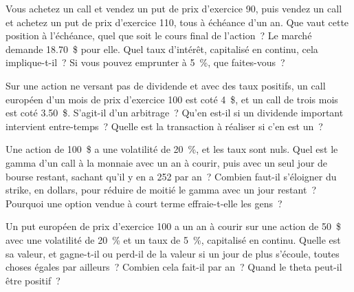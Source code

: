 \begin{question}\label{iq:iv2:options-parity-and-greeks:18}
Vous achetez un call et vendez un put de prix d'exercice 90, puis vendez un call et achetez un put de prix d'exercice 110, tous à échéance d'un an. Que vaut cette position à l'échéance, quel que soit le cours final de l'action~? Le marché demande 18.70~\$ pour elle. Quel taux d'intérêt, capitalisé en continu, cela implique-t-il~? Si vous pouvez emprunter à 5~\%, que faites-vous~?
\end{question}

\begin{question}\label{iq:iv2:options-parity-and-greeks:19}
Sur une action ne versant pas de dividende et avec des taux positifs, un call européen d'un mois de prix d'exercice 100 est coté 4~\$, et un call de trois mois est coté 3.50~\$. S'agit-il d'un arbitrage~? Qu'en est-il si un dividende important intervient entre-temps~? Quelle est la transaction à réaliser si c'en est un~?
\end{question}

\begin{question}\label{iq:iv2:options-parity-and-greeks:20}
Une action de 100~\$ a une volatilité de 20~\%, et les taux sont nuls. Quel est le gamma d'un call à la monnaie avec un an à courir, puis avec un seul jour de bourse restant, sachant qu'il y en a 252 par an~? Combien faut-il s'éloigner du strike, en dollars, pour réduire de moitié le gamma avec un jour restant~? Pourquoi une option vendue à court terme effraie-t-elle les gens~?
\end{question}

\begin{question}\label{iq:iv2:options-parity-and-greeks:21}
Un put européen de prix d'exercice 100 a un an à courir sur une action de 50~\$ avec une volatilité de 20~\% et un taux de 5~\%, capitalisé en continu. Quelle est sa valeur, et gagne-t-il ou perd-il de la valeur si un jour de plus s'écoule, toutes choses égales par ailleurs~? Combien cela fait-il par an~? Quand le theta peut-il être positif~?
\end{question}

